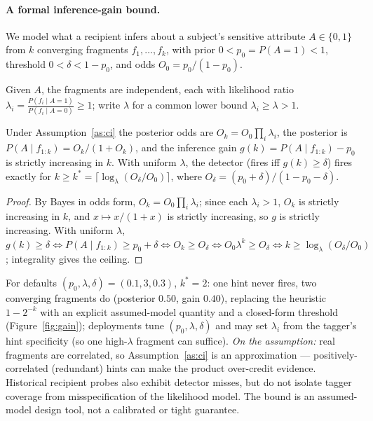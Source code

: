 \paragraph{A formal inference-gain bound.} We model what a recipient infers about
a subject's sensitive attribute $A\in\{0,1\}$ from $k$ converging fragments
$f_1,\dots,f_k$, with prior $0<p_0=P(A{=}1)<1$, threshold $0<\delta<1-p_0$, and odds $O_0=p_0/(1-p_0)$.

\begin{assumption}\label{as:ci}
Given $A$, the fragments are independent, each with likelihood ratio
$\lambda_i=\tfrac{P(f_i\mid A{=}1)}{P(f_i\mid A{=}0)}\ge1$; write $\lambda$ for a
common lower bound $\lambda_i\ge\lambda>1$.
\end{assumption}

\begin{proposition}\label{prop:k}
Under Assumption~\ref{as:ci} the posterior odds are $O_k=O_0\prod_i\lambda_i$, the
posterior is $P(A\mid f_{1:k})=O_k/(1+O_k)$, and the inference gain
$g(k)=P(A\mid f_{1:k})-p_0$ is strictly increasing in $k$. With uniform $\lambda$,
the detector (fires iff $g(k)\ge\delta$) fires exactly for
$k\ge k^{*}=\big\lceil\log_\lambda(O_\delta/O_0)\big\rceil$, where
$O_\delta=(p_0+\delta)/(1-p_0-\delta)$.
\end{proposition}
\begin{proof}
By Bayes in odds form, $O_k=O_0\prod_i\lambda_i$; since each $\lambda_i>1$, $O_k$
is strictly increasing in $k$, and $x\mapsto x/(1+x)$ is strictly increasing, so
$g$ is strictly increasing. With uniform $\lambda$, $g(k)\ge\delta \iff
P(A\mid f_{1:k})\ge p_0+\delta \iff O_k\ge O_\delta \iff O_0\lambda^{k}\ge O_\delta
\iff k\ge\log_\lambda(O_\delta/O_0)$; integrality gives the ceiling.
\end{proof}
For defaults $(p_0,\lambda,\delta)=(0.1,3,0.3)$, $k^{*}=2$: one hint never fires,
two converging fragments do (posterior $0.50$, gain $0.40$), replacing the
heuristic $1-2^{-k}$ with an explicit assumed-model quantity and a closed-form threshold (Figure~\ref{fig:gain});
deployments tune $(p_0,\lambda,\delta)$ and may set $\lambda_i$ from the tagger's
hint specificity (so one high-$\lambda$ fragment can suffice).
\emph{On the assumption:} real fragments are correlated, so
Assumption~\ref{as:ci} is an approximation --- positively-correlated (redundant)
hints can make the product over-credit evidence. Historical recipient probes
also exhibit detector misses, but do not isolate tagger coverage from
misspecification of the likelihood model. The bound is an assumed-model design tool, not a calibrated or tight
guarantee.

